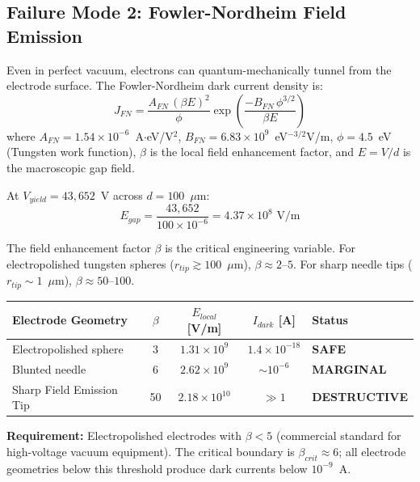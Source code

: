 \subsection{Failure Mode 2: Fowler-Nordheim Field Emission}

Even in perfect vacuum, electrons can quantum-mechanically tunnel from the electrode surface. The Fowler-Nordheim dark current density is:
\begin{equation}
    J_{FN} = \frac{A_{FN}\, (\beta E)^2}{\phi} \exp\!\left(\frac{-B_{FN}\, \phi^{3/2}}{\beta E}\right)
    \label{eq:fowler_nordheim}
\end{equation}
where $A_{FN} = 1.54 \times 10^{-6}$~A$\cdot$eV/V$^2$, $B_{FN} = 6.83 \times 10^{9}$~eV$^{-3/2}$V/m, $\phi = 4.5$~eV (Tungsten work function), $\beta$ is the local field enhancement factor, and $E = V/d$ is the macroscopic gap field.

At $V_{yield} = 43{,}652$~V across $d = 100$~$\mu$m:
\begin{equation}
    E_{gap} = \frac{43{,}652}{100 \times 10^{-6}} = 4.37 \times 10^{8}\text{ V/m}
\end{equation}

The field enhancement factor $\beta$ is the critical engineering variable. For electropolished tungsten spheres ($r_{tip} \gtrsim 100$~$\mu$m), $\beta \approx 2$--$5$. For sharp needle tips ($r_{tip} \sim 1$~$\mu$m), $\beta \approx 50$--$100$.

\begin{center}
\renewcommand{\arraystretch}{1.2}
\begin{tabularx}{\textwidth}{@{}lcccX@{}}
\toprule
\textbf{Electrode Geometry} & $\beta$ & $E_{local}$ [V/m] & $I_{dark}$ [A] & \textbf{Status} \\
\midrule
Electropolished sphere   & 3   & $1.31 \times 10^{9}$ & $1.4 \times 10^{-18}$ & \textbf{SAFE} \\
Blunted needle           & 6   & $2.62 \times 10^{9}$ & $\sim 10^{-6}$        & \textbf{MARGINAL} \\
Sharp Field Emission Tip & 50  & $2.18 \times 10^{10}$ & $\gg 1$               & \textbf{DESTRUCTIVE} \\
\bottomrule
\end{tabularx}
\end{center}

\textbf{Requirement:} Electropolished electrodes with $\beta < 5$ (commercial standard for high-voltage vacuum equipment). The critical boundary is $\beta_{crit} \approx 6$; all electrode geometries below this threshold produce dark currents below $10^{-9}$~A.

